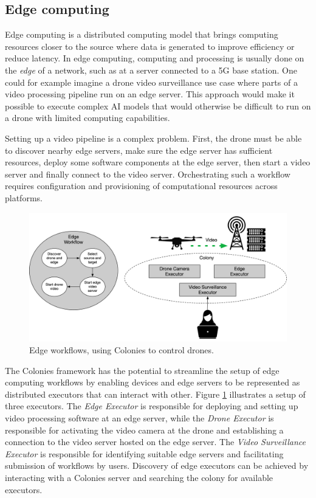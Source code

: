 \documentclass{article}
\begin{document}
\subsection{Edge computing}
Edge computing is a distributed computing model that brings computing resources closer to the source where data is generated to improve efficiency or reduce latency. In edge computing, computing and processing is usually done on the \emph{edge} of a network, such as at a server connected to a 5G base station. One could for example imagine a drone video surveillance use case where parts of a video processing pipeline run on an edge server. This approach would make it possible to execute complex AI models that would otherwise be difficult to run on a drone with limited computing capabilities.

Setting up a video pipeline is a complex problem. First, the drone must be able to discover nearby edge servers, make sure the edge server has sufficient resources, deploy some software components at the edge server, then start a video server and finally connect to the video server. Orchestrating such a workflow requires configuration and provisioning of computational resources across platforms. 

\begin{figure}[h]
	\centering
    \includegraphics[scale=0.43]{edge.png}
	\caption{Edge workflows, using Colonies to control drones.}
	\label{fig:edge}
\end{figure}

The Colonies framework has the potential to streamline the setup of edge computing workflows by enabling devices and edge servers to be represented as distributed executors that can interact with other. Figure \ref{fig:edge} illustrates a setup of three executors. The \emph{Edge Executor} is responsible for deploying and setting up video processing software at an edge server, while the \emph{Drone Executor} is responsible for activating the video camera at the drone and establishing a connection to the video server hosted on the edge server. The \emph{Video Surveillance Executor} is responsible for identifying suitable edge servers and facilitating submission of workflows by users. Discovery of edge executors can be achieved by interacting with a Colonies server and searching the colony for available executors.
\end{document}
